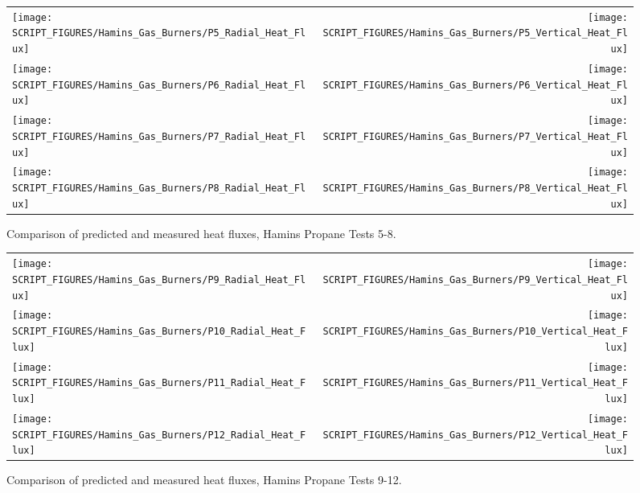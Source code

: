 \begin{figure}[p]
\begin{tabular*}{\textwidth}{l@{\extracolsep{\fill}}r}
\texttt{[image: SCRIPT\_FIGURES/Hamins\_Gas\_Burners/P5\_Radial\_Heat\_Flux]} &
\texttt{[image: SCRIPT\_FIGURES/Hamins\_Gas\_Burners/P5\_Vertical\_Heat\_Flux]} \\
\texttt{[image: SCRIPT\_FIGURES/Hamins\_Gas\_Burners/P6\_Radial\_Heat\_Flux]} &
\texttt{[image: SCRIPT\_FIGURES/Hamins\_Gas\_Burners/P6\_Vertical\_Heat\_Flux]} \\
\texttt{[image: SCRIPT\_FIGURES/Hamins\_Gas\_Burners/P7\_Radial\_Heat\_Flux]} &
\texttt{[image: SCRIPT\_FIGURES/Hamins\_Gas\_Burners/P7\_Vertical\_Heat\_Flux]} \\
\texttt{[image: SCRIPT\_FIGURES/Hamins\_Gas\_Burners/P8\_Radial\_Heat\_Flux]} &
\texttt{[image: SCRIPT\_FIGURES/Hamins\_Gas\_Burners/P8\_Vertical\_Heat\_Flux]}
\end{tabular*}
\label{Hamins_Propane_5-8}
\caption[Heat flux predictions, Hamins propane burner Tests 5-8]
{Comparison of predicted and measured heat fluxes, Hamins Propane Tests 5-8.}
\end{figure}

\begin{figure}[p]
\begin{tabular*}{\textwidth}{l@{\extracolsep{\fill}}r}
\texttt{[image: SCRIPT\_FIGURES/Hamins\_Gas\_Burners/P9\_Radial\_Heat\_Flux]} &
\texttt{[image: SCRIPT\_FIGURES/Hamins\_Gas\_Burners/P9\_Vertical\_Heat\_Flux]} \\
\texttt{[image: SCRIPT\_FIGURES/Hamins\_Gas\_Burners/P10\_Radial\_Heat\_Flux]} &
\texttt{[image: SCRIPT\_FIGURES/Hamins\_Gas\_Burners/P10\_Vertical\_Heat\_Flux]} \\
\texttt{[image: SCRIPT\_FIGURES/Hamins\_Gas\_Burners/P11\_Radial\_Heat\_Flux]} &
\texttt{[image: SCRIPT\_FIGURES/Hamins\_Gas\_Burners/P11\_Vertical\_Heat\_Flux]} \\
\texttt{[image: SCRIPT\_FIGURES/Hamins\_Gas\_Burners/P12\_Radial\_Heat\_Flux]} &
\texttt{[image: SCRIPT\_FIGURES/Hamins\_Gas\_Burners/P12\_Vertical\_Heat\_Flux]}
\end{tabular*}
\label{Hamins_Propane_9-12}
\caption[Heat flux predictions, Hamins propane burner Tests 9-12]
{Comparison of predicted and measured heat fluxes, Hamins Propane Tests 9-12.}
\end{figure}

